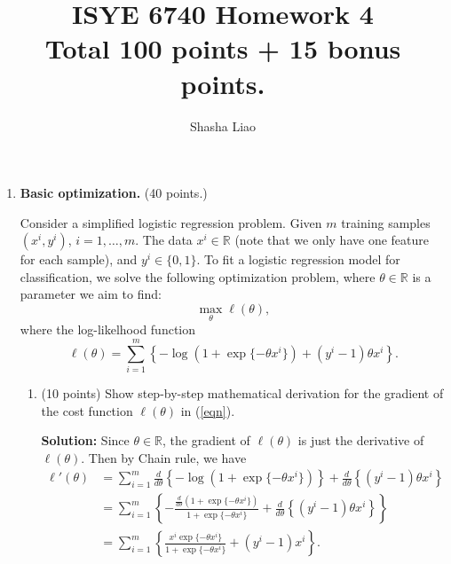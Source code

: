 \documentclass[twoside,10pt]{article}
\begin{document}
\title{ISYE 6740 Homework 4\\ 
\small Total 100 points + 15 bonus points. }
\author{Shasha Liao}
\date{}
\maketitle

\begin{enumerate}

\item {\bf Basic optimization.} (40 points.)

Consider a simplified logistic regression problem. 
Given $m$ training samples $(x^i, y^i)$, $i = 1, \ldots, m$. The data $x^i \in \mathbb R$ (note that we only have one feature for each sample), and $y^i \in \{0, 1\}$.  To fit a logistic regression model for classification, we solve the following optimization problem, where $\theta \in \mathbb R$ is a parameter we aim to find:
\begin{equation}
\max_\theta \ell (\theta), \label{eqn}
\end{equation}
where the log-likelhood function \[\ell(\theta) = \sum_{i=1}^m \left\{-\log (1+\exp\{-\theta x^i\}) + (y^i-1) \theta x^i\right\}.\]

\begin{enumerate}
\item (10 points) Show step-by-step mathematical derivation for the gradient of the cost function $\ell(\theta)$ in (\ref{eqn}).
\begin{tcolorbox}
\textbf{Solution:} Since $\theta \in \mathbb R$, the gradient of $\ell(\theta)$ is just the derivative of $\ell(\theta)$. Then by Chain rule, we have
\begin{align*}
 \ell'(\theta) &= \sum_{i=1}^m \frac{d}{d \theta} \left\{ -\log (1+\exp\{-\theta x^i\})\right\} + \frac{d}{d \theta} \left\{ (y^i-1) \theta x^i\right\}\\
 &= \sum_{i=1}^m \left\{  -\frac{\frac{d}{d \theta} (1+\exp\{-\theta x^i\}) }{1+\exp\{-\theta x^i\}}+ \frac{d}{d \theta} \left\{ (y^i-1) \theta x^i\right\}\right\}\\
 &= \sum_{i=1}^m  \left\{ \frac{x^i\exp\{-\theta x^i\}} {1+\exp\{-\theta x^i\}} + (y^i-1)x^i\right\}.\\
\end{align*}
\end{tcolorbox}


\end{enumerate}
\end{enumerate}
\end{document}
